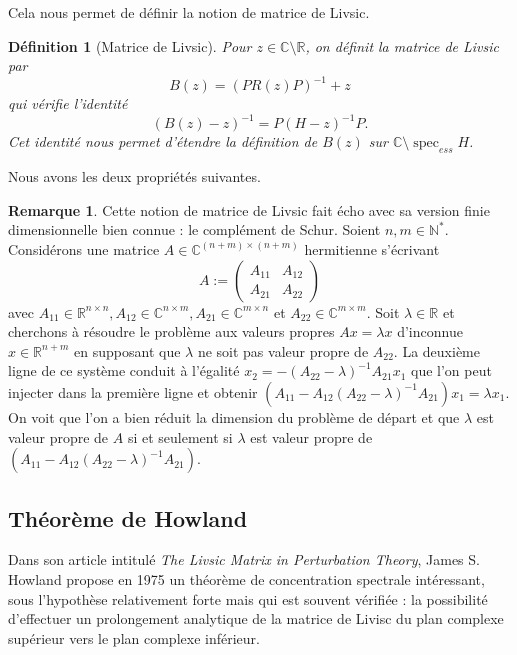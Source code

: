 \documentclass[12pt,openany,a4paper, titlepage]{article}
\newcommand{\R}{\mathbb{R}}
\newcommand{\C}{\mathbb{C}}
\newcommand{\N}{\mathbb{N}}
\newcommand{\spec}{\operatorname{spec}}
\newcommand{\inv}{^{-1}}
\newtheorem{Def}{Définition}
\theoremstyle{definition}
\theoremstyle{definition}
\theoremstyle{definition}
\theoremstyle{definition}
\newtheorem{rem}{Remarque}
\theoremstyle{definition}
\begin{document}
Cela nous permet de définir la notion de matrice de Livsic.

\begin{Def}[Matrice de Livsic]
Pour $z\in \C\setminus\R$, on définit la matrice de Livsic par
\begin{equation*}
    B(z) = (PR(z)P)\inv + z
\end{equation*}
qui vérifie l'identité 
\begin{equation*}
    (B(z)-z)\inv = P(H-z)\inv P.
\end{equation*}
Cet identité nous permet d'étendre la définition de $B(z)$ sur $\C\setminus\spec_{ess} H$.
\end{Def}

Nous avons les deux propriétés suivantes.

\begin{rem}
Cette notion de matrice de Livsic fait écho avec sa version finie dimensionnelle bien connue : le complément de Schur.  
Soient $n,m \in\N^*$. Considérons une matrice $A\in\C^{(n+m)\times (n+m)}$ hermitienne s'écrivant 
\begin{equation*}
    A:= \begin{pmatrix}
A_{11} & A_{12} \\
A_{21} & A_{22} 
\end{pmatrix}
\end{equation*}
avec $A_{11}\in\R^{n\times n},  A_{12}\in\C^{n\times m}, A_{21}\in\C^{m\times n}$ et $A_{22}\in\C^{m\times m}$. Soit $\lambda \in \R$ et cherchons à résoudre le problème aux valeurs propres $Ax = \lambda x$ d'inconnue $x\in\R^{n+m}$ en supposant que $\lambda$ ne soit pas valeur propre de $A_{22}$. La deuxième ligne de ce système conduit à l'égalité $x_2 = -(A_{22}-\lambda)^{-1}A_{21}x_1$ que l'on peut injecter dans la première ligne et obtenir $(A_{11} - A_{12}(A_{22}-\lambda)^{-1}A_{21})x_1 = \lambda x_1 $. On voit que l'on a bien réduit la dimension du problème de départ et que $\lambda$ est valeur propre de $A$ si et seulement si $\lambda$ est valeur propre de $(A_{11} - A_{12}(A_{22}-\lambda)^{-1}A_{21})$.
\end{rem}

\subsection{Théorème de Howland}

Dans son article intitulé \textit{The Livsic  Matrix in Perturbation Theory}, James S. Howland propose en 1975 un théorème de concentration spectrale intéressant, sous l'hypothèse relativement forte mais qui est souvent vérifiée : la possibilité d'effectuer un prolongement analytique de la matrice de Livisc du plan complexe supérieur vers le plan complexe inférieur.
\end{document}
